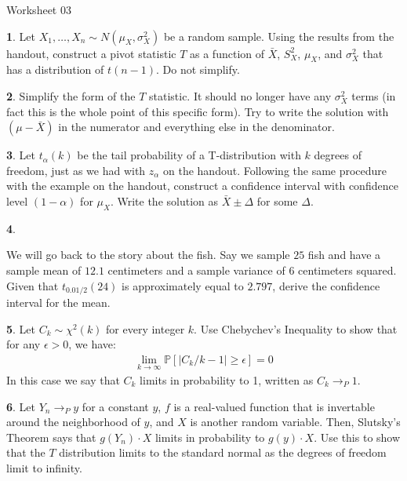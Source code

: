 \documentclass{tufte-handout}
\begin{document}
\justify

{\LARGE Worksheet 03}

\vspace*{18pt}


\textbf{1}. Let $X_1, \ldots, X_n \sim N(\mu_X, \sigma_X^2)$ be a random sample. Using
the results from the handout, construct a pivot statistic $T$ as a function
of $\bar{X}$, $S_X^2$, $\mu_X$, and $\sigma_X^2$ that has a distribution of
$t(n-1)$. Do not simplify.

\textbf{2}. Simplify the form of the $T$ statistic. It should no longer have any
$\sigma_X^2$ terms (in fact this is the whole point of this specific form). 
Try to write the solution with $(\mu - \bar{X})$ in the numerator and
everything else in the denominator.

\textbf{3}. Let $t_\alpha(k)$ be the tail probability of a T-distribution with $k$
degrees of freedom, just as we had with $z_\alpha$ on the handout. Following
the same procedure with the example on the handout, construct a confidence
interval with confidence level $(1 - \alpha)$ for $\mu_X$. Write the solution
as $\bar{X} \pm \Delta$ for some $\Delta$.

\textbf{4}. %

We will go back to the story about the fish. Say we sample $25$ fish and
have a sample mean of $12.1$ centimeters and a sample variance of $6$
centimeters squared. Given that $t_{0.01/2}(24)$ is approximately equal
to $2.797$, derive the confidence interval for the mean.

\textbf{5}. Let $C_k \sim \chi^2(k)$ for every integer $k$. Use Chebychev's Inequality to show
that for any $\epsilon > 0$, we have:
\begin{align*}
\lim_{k \rightarrow \infty} \mathbb{P} \left[ |C_k/k - 1| \geq \epsilon \right] = 0
\end{align*}
In this case we say that $C_k$ limits in probability to 1, written as
$C_k \rightarrow_P 1$.

\textbf{6}. Let $Y_n \rightarrow_P y$ for a constant $y$, $f$ is a real-valued function that
is invertable around the neighborhood of $y$, and $X$ is another random variable.
Then, Slutsky's Theorem says that $g(Y_n) \cdot X$ limits in probability to
$g(y) \cdot X$. Use this to show that the $T$ distribution limits to the standard
normal as the degrees of freedom limit to infinity.
\end{document}
